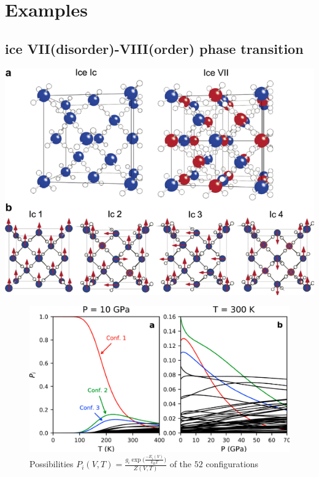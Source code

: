 \documentclass[13pt,aspectratio=169]{beamer}
\begin{document}
\section{Examples}

\subsection{ice VII(disorder)-VIII(order) phase transition}
\begin{frame}{\subsecname}
	\centering
	\includegraphics[height=0.9\textheight]{images/ice7}%
\end{frame}

\begin{frame}{\subsecname}
	\begin{figure}
		\includegraphics[height=0.8\textheight]{images/ice_prob}%
		\caption{Possibilities $P_i(V, T) = \frac{g_i \exp\Big(\frac{-E_i(V)}{k_B T}\Big)}{Z(V, T)}$ of the $52$ configurations}
	\end{figure}
\end{frame}
\end{document}
